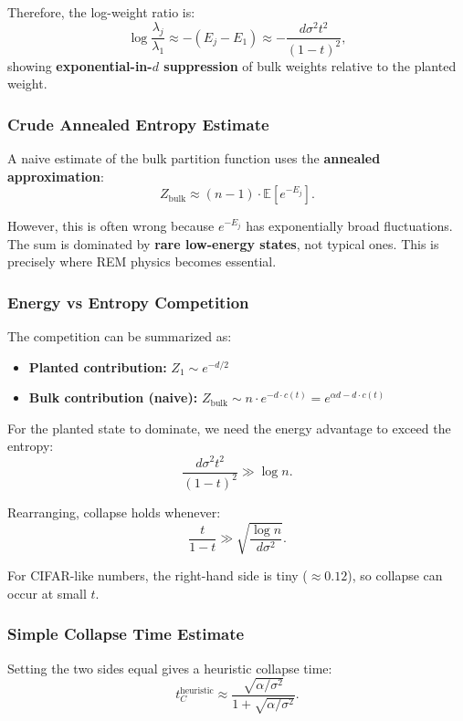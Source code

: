 \documentclass[11pt]{article}
\begin{document}
Therefore, the log-weight ratio is:
\begin{equation}
\log\frac{\lambda_j}{\lambda_1}\approx -(E_j-E_1)\approx -\frac{d\sigma^2 t^2}{(1-t)^2},
\end{equation}
showing \textbf{exponential-in-$d$ suppression} of bulk weights relative to the planted weight.

\subsubsection{Crude Annealed Entropy Estimate}
A naive estimate of the bulk partition function uses the \textbf{annealed approximation}:
\begin{equation}
Z_{\text{bulk}} \approx (n-1) \cdot \mathbb{E}[e^{-E_j}].
\end{equation}

However, this is often wrong because $e^{-E_j}$ has exponentially broad fluctuations. The sum is dominated by \textbf{rare low-energy states}, not typical ones. This is precisely where REM physics becomes essential.

\subsubsection{Energy vs Entropy Competition}
The competition can be summarized as:
\begin{itemize}
\item \textbf{Planted contribution:} $Z_1 \sim e^{-d/2}$
\item \textbf{Bulk contribution (naive):} $Z_{\text{bulk}} \sim n \cdot e^{-d \cdot c(t)} = e^{\alpha d - d \cdot c(t)}$
\end{itemize}

For the planted state to dominate, we need the energy advantage to exceed the entropy:
\begin{equation}
\frac{d \sigma^2 t^2}{(1-t)^2} \gg \log n.
\end{equation}

Rearranging, collapse holds whenever:
\begin{equation}
\frac{t}{1-t} \gg \sqrt{\frac{\log n}{d \sigma^2}}.
\end{equation}

For CIFAR-like numbers, the right-hand side is tiny ($\approx 0.12$), so collapse can occur at small $t$.

\subsubsection{Simple Collapse Time Estimate}
Setting the two sides equal gives a heuristic collapse time:
\begin{equation}
t_C^{\text{heuristic}} \approx \frac{\sqrt{\alpha/\sigma^2}}{1 + \sqrt{\alpha/\sigma^2}}.
\end{equation}
\end{document}
